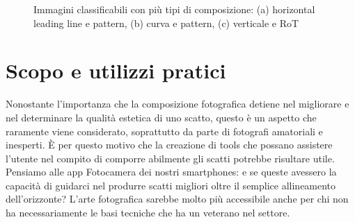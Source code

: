 \vspace{7mm}

\begin{figure}[t] 
    \centering
    \caption{Immagini classificabili con più tipi di composizione: (a) horizontal leading line e pattern, (b) curva e pattern, (c) verticale e RoT}
    \label{fig:multilabel_examples}
\end{figure}


\section{Scopo e utilizzi pratici}
Nonostante l'importanza che la composizione fotografica detiene nel migliorare e nel determinare la qualità estetica di uno scatto, questo è un aspetto che raramente viene considerato, soprattutto da parte di fotografi amatoriali e inesperti. È per questo motivo che la creazione di tools che possano assistere l'utente nel compito di comporre abilmente gli scatti potrebbe risultare utile. Pensiamo alle app Fotocamera dei nostri smartphones: e se queste avessero la capacità di guidarci nel produrre scatti migliori oltre il semplice allineamento dell'orizzonte? L'arte fotografica sarebbe molto più accessibile anche per chi non ha necessariamente le basi tecniche che ha un veterano nel settore. 

